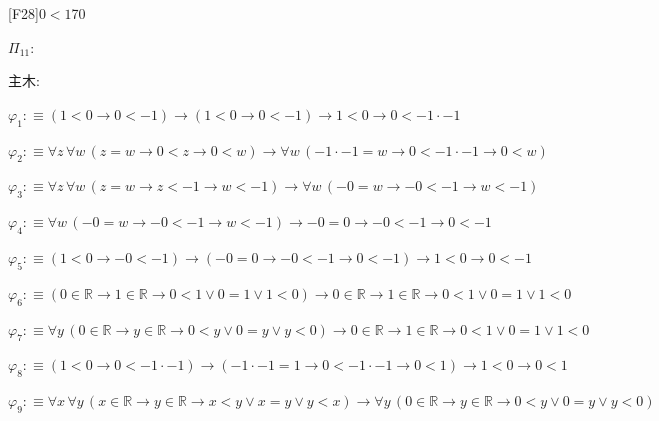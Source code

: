 \begin{fullproof}{[F28]}{$0 < 1$}{70}
\begin{ptree}
\end{ptree}
\noindent$\Pi_{11}$:
\begin{ptree}
\noLine
{}
\end{ptree}
\noindent 主木:
\begin{ptree}
\noLine
{}
\noLine
{}
\end{ptree}
\begin{abbrevlist}
\item $\varphi_{1} :\equiv (1 < 0 \to 0 < -1) \to (1 < 0 \to 0 < -1) \to 1 < 0 \to 0 < -1 \cdot -1$
\item $\varphi_{2} :\equiv \forall z\,\forall w\,(z = w \to 0 < z \to 0 < w) \to \forall w\,(-1 \cdot -1 = w \to 0 < -1 \cdot -1 \to 0 < w)$
\item $\varphi_{3} :\equiv \forall z\,\forall w\,(z = w \to z < -1 \to w < -1) \to \forall w\,(-0 = w \to -0 < -1 \to w < -1)$
\item $\varphi_{4} :\equiv \forall w\,(-0 = w \to -0 < -1 \to w < -1) \to -0 = 0 \to -0 < -1 \to 0 < -1$
\item $\varphi_{5} :\equiv (1 < 0 \to -0 < -1) \to (-0 = 0 \to -0 < -1 \to 0 < -1) \to 1 < 0 \to 0 < -1$
\item $\varphi_{6} :\equiv (0 \in \mathbb{R} \to 1 \in \mathbb{R} \to 0 < 1 \lor 0 = 1 \lor 1 < 0) \to 0 \in \mathbb{R} \to 1 \in \mathbb{R} \to 0 < 1 \lor 0 = 1 \lor 1 < 0$
\item $\varphi_{7} :\equiv \forall y\,(0 \in \mathbb{R} \to y \in \mathbb{R} \to 0 < y \lor 0 = y \lor y < 0) \to 0 \in \mathbb{R} \to 1 \in \mathbb{R} \to 0 < 1 \lor 0 = 1 \lor 1 < 0$
\item $\varphi_{8} :\equiv (1 < 0 \to 0 < -1 \cdot -1) \to (-1 \cdot -1 = 1 \to 0 < -1 \cdot -1 \to 0 < 1) \to 1 < 0 \to 0 < 1$
\item $\varphi_{9} :\equiv \forall x\,\forall y\,(x \in \mathbb{R} \to y \in \mathbb{R} \to x < y \lor x = y \lor y < x) \to \forall y\,(0 \in \mathbb{R} \to y \in \mathbb{R} \to 0 < y \lor 0 = y \lor y < 0)$

\end{abbrevlist}
\end{fullproof}

